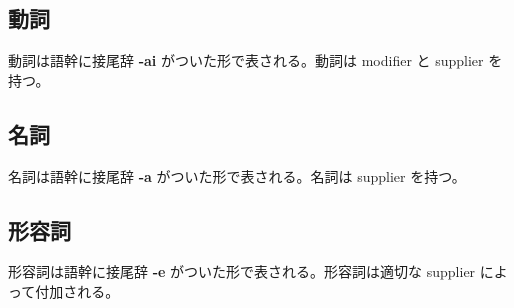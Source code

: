\subsection{動詞}

動詞は語幹に接尾辞 \textbf{-ai} がついた形で表される。動詞は modifier と supplier を持つ。

\subsection{名詞}

名詞は語幹に接尾辞 \textbf{-a} がついた形で表される。名詞は supplier を持つ。

\subsection{形容詞}

形容詞は語幹に接尾辞 \textbf{-e} がついた形で表される。形容詞は適切な supplier によって付加される。